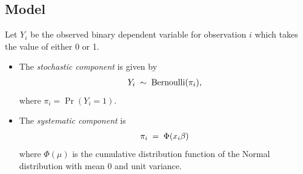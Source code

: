 \documentclass[letterpaper,10pt,english]{sphinxmanual}
\begin{document}
\subsection{Model}
\label{vignette:id48}
Let \(Y_i\) be the observed binary dependent variable for
observation \(i\) which takes the value of either 0 or 1.
\begin{itemize}
\item {} 
The \emph{stochastic component} is given by
\begin{gather}
\begin{split}Y_i \; \sim \; \textrm{Bernoulli}(\pi_i),\end{split}\notag
\end{gather}
where \(\pi_i=\Pr(Y_i=1)\).

\item {} 
The \emph{systematic component} is
\begin{gather}
\begin{split}\pi_i \; = \; \Phi (x_i \beta)\end{split}\notag
\end{gather}
where \(\Phi(\mu)\) is the cumulative distribution function of
the Normal distribution with mean 0 and unit variance.

\end{itemize}
\end{document}

